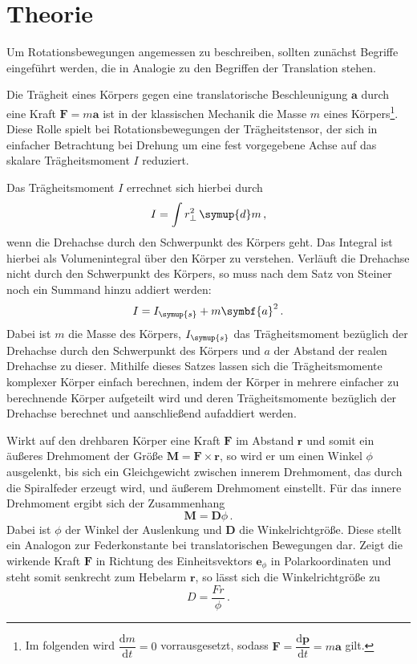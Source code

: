 \section{Theorie}
\label{sec:Theorie}
Um Rotationsbewegungen angemessen zu beschreiben, sollten zunächst Begriffe
eingeführt werden, die in Analogie zu den Begriffen der Translation stehen.

Die Trägheit eines Körpers gegen eine translatorische Beschleunigung $\symbf{a}$
durch eine Kraft $\symbf{F}=m\symbf{a}$ ist in der klassischen Mechanik die
Masse $m$ eines Körpers\footnote{Im folgenden wird
$\dfrac{\mathrm{d}m}{\mathrm{d}t}=0$ vorrausgesetzt, sodass
$\symbf{F}=\dfrac{\mathrm{d}\symbf{p}}{\mathrm{d}t}=m\symbf{a}$ gilt.}.
Diese Rolle spielt bei Rotationsbewegungen der Trägheitstensor, der sich in
einfacher Betrachtung bei Drehung um eine fest vorgegebene Achse auf das skalare
Trägheitsmoment $I$ reduziert.

Das Trägheitsmoment $I$ errechnet sich hierbei durch
\begin{equation}
  I=\int r_{\perp}^2 \,\symup{d}m\,,
  \label{eqn:traegheitallg}
\end{equation}
wenn die Drehachse durch den Schwerpunkt des Körpers geht. Das Integral ist hierbei
als Volumenintegral über den Körper zu verstehen. Verläuft die Drehachse nicht
durch den Schwerpunkt des Körpers, so muss nach dem Satz von Steiner noch ein
Summand hinzu addiert werden:
\begin{equation}
  I=I_{\symup{s}}+m\symbf{a}^2\,.
  \label{eqn:steiner}
\end{equation}
Dabei ist $m$ die Masse des Körpers, $I_{\symup{s}}$ das Trägheitsmoment bezüglich
der Drehachse durch den Schwerpunkt des Körpers und $a$ der Abstand der realen
Drehachse zu dieser. Mithilfe dieses Satzes lassen sich die Trägheitsmomente
komplexer Körper einfach berechnen, indem der Körper in mehrere einfacher zu berechnende
Körper aufgeteilt wird und deren Trägheitsmomente bezüglich der Drehachse berechnet
und aanschließend aufaddiert werden.

Wirkt auf den drehbaren Körper eine Kraft $\symbf{F}$ im Abstand $\symbf{r}$ und somit ein
äußeres Drehmoment der Größe $\symbf{M}=\symbf{F}\times\symbf{r}$, so wird er um
einen Winkel $\phi$ ausgelenkt, bis sich ein Gleichgewicht zwischen innerem Drehmoment,
das durch die Spiralfeder erzeugt wird, und äußerem Drehmoment einstellt. Für das innere
Drehmoment ergibt sich der Zusammenhang
\begin{equation}
  \symbf{M}=\symbf{D}\phi\,.
  \label{eqn:drehmoment_innen}
\end{equation}
Dabei ist $\phi$ der Winkel der Auslenkung und $\symbf{D}$ die Winkelrichtgröße.
Diese stellt ein Analogon zur Federkonstante bei translatorischen Bewegungen dar.
Zeigt die wirkende Kraft $\symbf{F}$ in Richtung des Einheitsvektors $\symbf{e}_{\phi}$
in Polarkoordinaten und steht somit senkrecht zum Hebelarm $\symbf{r}$, so lässt sich
die Winkelrichtgröße zu
\begin{equation}
  {D}=\frac{Fr}{\phi}\,.
  \label{eqn:winkelrg}
\end{equation}

